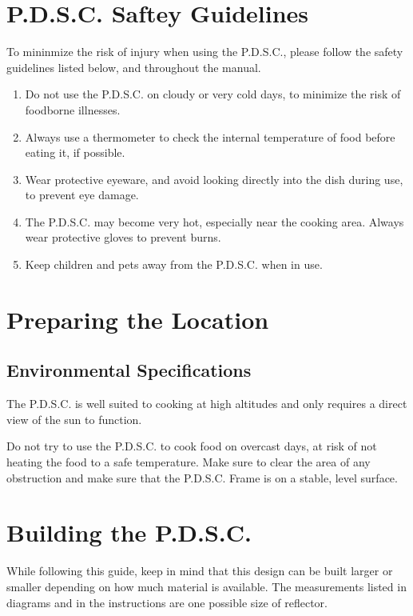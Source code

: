 \documentclass[titlepage]{article}
\begin{document}
    \section{P.D.S.C. Saftey Guidelines}
        To mininmize the risk of injury when using the P.D.S.C., please follow the safety guidelines listed below, and throughout the manual.
        \begin{enumerate}
            \item Do not use the P.D.S.C. on cloudy or very cold days, to minimize the risk of foodborne illnesses.
            \item Always use a thermometer to check the internal temperature of food before eating it, if possible.
            \item Wear protective eyeware, and avoid looking directly into the dish during use, to prevent eye damage.
            \item The P.D.S.C. may become very hot, especially near the cooking area.  Always wear protective gloves to prevent burns.
            \item Keep children and pets away from the P.D.S.C. when in use.
        \end{enumerate}
    \section{Preparing the Location}
        \subsection{Environmental Specifications}
        The P.D.S.C. is well suited to cooking at high altitudes and only requires
        a direct view of the sun to function.  
        
        Do not try to use the P.D.S.C. to cook food 
        on overcast days, at risk of not heating the food to a safe temperature. 
        Make sure to clear the area of any obstruction and make sure that the P.D.S.C. Frame is 
        on a stable, level surface.

    \section{Building the P.D.S.C.}
        While following this guide, keep in mind that this design can be built
        larger or smaller depending on how much material is available.  The measurements listed
        in diagrams and in the instructions are one possible size of reflector. 
        
\end{document}
